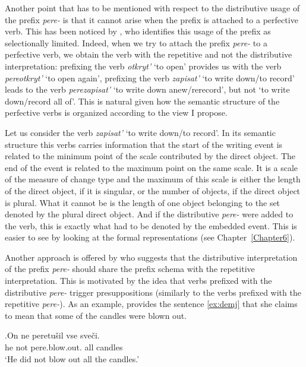 Another point that has to be mentioned with respect to the distributive usage of the prefix \textit{pere-} is that it cannot arise when the prefix is attached to a perfective verb. This has been noticed by \citet{Tatevosov:09}, who identifies this usage of the prefix as selectionally limited. Indeed, when we try to attach the prefix \textit{pere-} to a perfective verb, we obtain the verb with the repetitive and not the distributive interpretation: prefixing the verb \textit{otkryt'} `to open' provides us with the verb \textit{pereotkryt'} `to open again', prefixing the verb \textit{zapisat'} `to write down/to record' leads to the verb \textit{perezapisat'} `to write down anew/rerecord', but not `to write down/record all of'. This is natural given how the semantic structure of the perfective verbs is organized according to the view I propose.

Let us consider the verb \textit{zapisat'} `to write down/to record'. In its semantic structure this verbs carries information that the start of the writing event is related to the minimum point of the scale contributed by the direct object. The end of the event is related to the maximum point on the same scale. It is a scale of the measure of change type and the maximum of this scale is either the length of the direct object, if it is singular, or the number of objects, if the direct object is plural. What it cannot be is the length of one object belonging to the set denoted by the plural direct object. And if the distributive \textit{pere-} were added to the verb, this is exactly what had to be denoted by the embedded event. This is easier to see by looking at the formal representations (see Chapter~\ref{Chapter6}).

Another approach is offered by \citet{Demjjanow:97} who suggests that the distributive interpretation of the prefix \textit{pere-} should share the prefix schema with the repetitive interpretation. This is motivated by the idea that verbs prefixed with the distributive \textit{pere-} trigger presuppositions (similarly to the verbs prefixed with the repetitive \textit{pere-}). As an example, \citet{Demjjanow:97} provides the sentence \ref{ex:demj} that she claims to mean that some of the candles were blown out.

\exg.\label{ex:demj}On ne peretu\v{s}il vse sve\v{c}i.\\
he not pere.blow.out. all candles\\
\trans `He did not blow out all the candles.'\\

